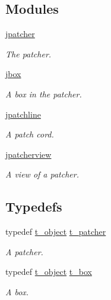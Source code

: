 \subsection*{Modules}
\begin{DoxyCompactItemize}
\item 
\hyperlink{group__jpatcher}{jpatcher}


\begin{DoxyCompactList}\small\item\em The patcher. \item\end{DoxyCompactList}\item 
\hyperlink{group__jbox}{jbox}


\begin{DoxyCompactList}\small\item\em A box in the patcher. \item\end{DoxyCompactList}\item 
\hyperlink{group__jpatchline}{jpatchline}


\begin{DoxyCompactList}\small\item\em A patch cord. \item\end{DoxyCompactList}\item 
\hyperlink{group__jpatcherview}{jpatcherview}


\begin{DoxyCompactList}\small\item\em A view of a patcher. \item\end{DoxyCompactList}\end{DoxyCompactItemize}
\subsection*{Typedefs}
\begin{DoxyCompactItemize}
\item 
typedef \hyperlink{structt__object}{t\_\-object} \hyperlink{group__patcher_ga17444ce85b4edde6ecc818081ffa1cfd}{t\_\-patcher}
\begin{DoxyCompactList}\small\item\em A patcher. \item\end{DoxyCompactList}\item 
typedef \hyperlink{structt__object}{t\_\-object} \hyperlink{group__patcher_ga4ae1309e71747dc0dc5c2baba5e47bc9}{t\_\-box}
\begin{DoxyCompactList}\small\item\em A box. \item\end{DoxyCompactList}\end{DoxyCompactItemize}
